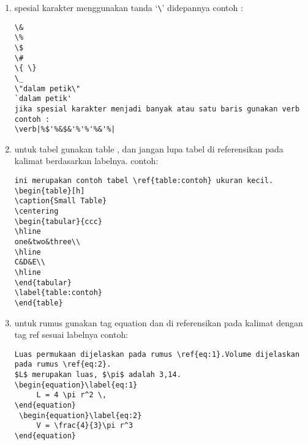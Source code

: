 \begin{enumerate}
\begin{verbatim}
\item
This is the second item in the numbered list.
\end{enumerate}

\begin{itemize}
\item
This is the first item in the itemized list.

\item
This is the first item in the itemized list.
This is the first item in the itemized list.
This is the first item in the itemized list.
\end{itemize}

\begin{itemize}
\item[]
This is the first item in the itemized list.

\item[]
This is the first item in the itemized list.
This is the first item in the itemized list.
This is the first item in the itemized list.
\end{itemize}
    \end{verbatim}
    
    \item spesial karakter menggunakan tanda `\verb|\|' didepannya contoh :
    \begin{verbatim}
\& 
\% 
\$ 
\#  
\{ \}
\_
\"dalam petik\"
`dalam petik'
jika spesial karakter menjadi banyak atau satu baris gunakan verb
contoh :
\verb|%$'%&$&'%'%'%&'%|
    \end{verbatim}
    
    \item untuk tabel gunakan table , dan jangan lupa tabel di referensikan pada kalimat berdasarkan labelnya. contoh:
    \begin{verbatim}
ini merupakan contoh tabel \ref{table:contoh} ukuran kecil.
\begin{table}[h]
\caption{Small Table}
\centering
\begin{tabular}{ccc}
\hline
one&two&three\\
\hline
C&D&E\\
\hline
\end{tabular}
\label{table:contoh}
\end{table}
    \end{verbatim}
    
    \item untuk rumus gunakan tag equation dan di referensikan pada kalimat dengan tag ref sesuai labelnya contoh:
    \begin{verbatim}
Luas permukaan dijelaskan pada rumus \ref{eq:1}.Volume dijelaskan 
pada rumus \ref{eq:2}.
$L$ merupakan luas, $\pi$ adalah 3,14.
\begin{equation}\label{eq:1}
     L = 4 \pi r^2 \,
\end{equation}
 \begin{equation}\label{eq:2}
     V = \frac{4}{3}\pi r^3
\end{equation}
    \end{verbatim}
    

\end{enumerate}
